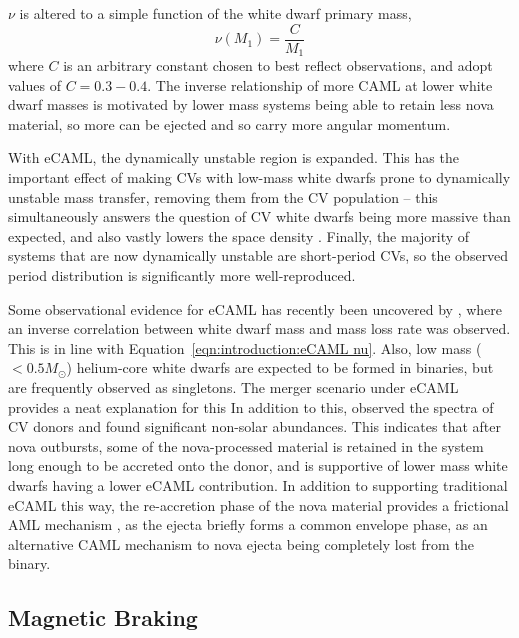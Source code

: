 $\nu$ is altered to a simple function of the white dwarf primary mass,
\begin{equation}
    \label{eqn:introduction:eCAML nu}
    \nu (M_1) = \frac{C}{M_1}
\end{equation}
where $C$ is an arbitrary constant chosen to best reflect observations, and \citep{Schreiber2016} adopt values of $C = 0.3 - 0.4$. The inverse relationship of more CAML at lower white dwarf masses is motivated by lower mass systems being able to retain less nova material, so more can be ejected and so carry more angular momentum. 

With eCAML, the dynamically unstable region  is expanded. This has the important effect of making CVs with low-mass white dwarfs prone to dynamically unstable mass transfer, removing them from the CV population -- this simultaneously answers the question of CV white dwarfs being more massive than expected, and also vastly lowers the space density \citep{belloni2018}. Finally, the majority of systems that are now dynamically unstable are short-period CVs, so the observed period distribution is significantly more well-reproduced. 

Some observational evidence for eCAML has recently been uncovered by \citet{Pala2021}, where an inverse correlation between white dwarf mass and mass loss rate was observed. This is in line with Equation~\ref{eqn:introduction:eCAML nu}. 
Also, low mass ($< 0.5 M_\odot$) helium-core white dwarfs are expected to be formed in binaries, but are frequently observed as singletons. The merger scenario under eCAML provides a neat explanation for this \citep{zorotovic2017}
In addition to this, \citet{sparks2021} observed the spectra of CV donors and found significant non-solar abundances. This indicates that after nova outbursts, some of the nova-processed material is retained in the system long enough to be accreted onto the donor, and is supportive of lower mass white dwarfs having a lower eCAML contribution. In addition to supporting traditional eCAML this way, the re-accretion phase of the nova material provides a frictional AML mechanism \citep{Schreiber2016,sparks2021}, as the ejecta briefly forms a common envelope phase, as an alternative CAML mechanism to nova ejecta being completely lost from the binary. 


\subsection{Magnetic Braking}
\label{sect:introduction:magnetic braking}

